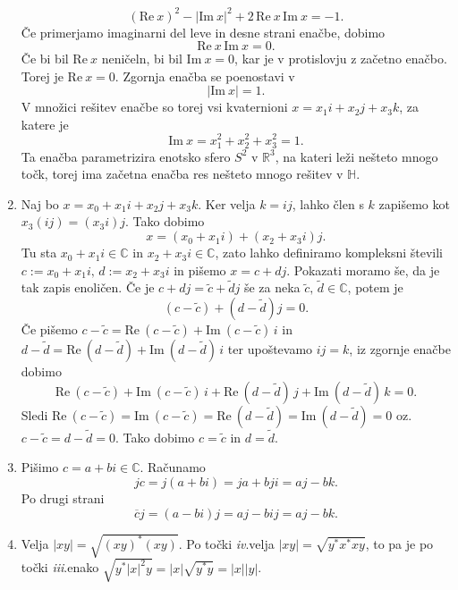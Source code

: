 \documentclass[mat1, tisk]{fmfdelo}
\numberwithin{equation}{section}
\begin{document}
\begin{dokaz}
\begin{enumerate}
        $$(\mathrm{Re} \: x)^2 - |\mathrm{Im} \: x|^2 + 2 \, \mathrm{Re} \: x \, \mathrm{Im} \: x = -1.$$
        Če primerjamo imaginarni del leve in desne strani enačbe, dobimo
        $$\mathrm{Re} \: x \, \mathrm{Im} \: x = 0.$$
        Če bi bil $\mathrm{Re} \: x$ neničeln, bi bil $\mathrm{Im} \: x = 0$, kar je v protislovju z začetno enačbo.
        Torej je $\mathrm{Re} \: x = 0$. Zgornja enačba se poenostavi v 
        $$|\mathrm{Im} \: x| = 1.$$
        V množici rešitev enačbe so torej vsi kvaternioni $x = x_{1}i + x_{2}j + x_{3}k$, za katere je 
        $$\mathrm{Im} \: x = x_{1}^2 + x_{2}^2 + x_{3}^2 = 1.$$
        Ta enačba parametrizira enotsko sfero $S^2$ v $\mathbb{R}^{3}$, na kateri leži nešteto mnogo točk, 
        torej ima začetna enačba res nešteto mnogo rešitev v $\mathbb{H}$.
        \item Naj bo
        $x = x_0 + x_1 i + x_2 j + x_3 k$.
        Ker velja $k=ij$, lahko člen s $k$ zapišemo kot $x_3(ij)=(x_3 i)j$. Tako dobimo
        \[
        x = (x_0 + x_1 i) + (x_2 + x_3 i)j.
        \]
        Tu sta $x_0+x_1 i\in\mathbb{C}$ in $x_2+x_3 i\in\mathbb{C}$, zato lahko definiramo kompleksni števili $c:=x_0+x_1 i, \, d:=x_2+x_3 i $
        in pišemo $x=c+dj$. Pokazati moramo še, da je tak zapis enoličen. Če je 
        $c+dj = \tilde{c} + \tilde{d}j$
        še za neka $\tilde{c}, \, \tilde{d} \in\mathbb{C}$, potem je
        \[
        (c-\tilde{c})+(d-\tilde{d})j=0.
        \]
        Če pišemo $c - \tilde{c} = \mathrm{Re} \: (c-\tilde{c}) + \mathrm{Im} \: (c-\tilde{c}) \, i$ in $d-\tilde{d} = \mathrm{Re} \:(d-\tilde{d}) + \mathrm{Im} \: (d-\tilde{d})\, i$
        ter upoštevamo $ij = k$, iz zgornje enačbe dobimo
        $$\mathrm{Re} \: (c-\tilde{c}) + \mathrm{Im} \: (c-\tilde{c}) \, i + \mathrm{Re} \:(d-\tilde{d})\, j + \mathrm{Im} \: (d-\tilde{d})\, k = 0.$$
        Sledi $\mathrm{Re} \: (c-\tilde{c}) = \mathrm{Im} \: (c-\tilde{c}) = \mathrm{Re} \:(d-\tilde{d}) = \mathrm{Im} \:(d-\tilde{d})= 0$ oz.\ 
        $c-\tilde{c} = d-\tilde{d} = 0$. Tako dobimo $c=\tilde{c}$ in $d=\tilde{d}$.
        \item Pišimo $c = a + bi \in \mathbb{C}$. Računamo
        $$jc = j(a + bi) = ja + bji = aj - bk.$$
        Po drugi strani 
        $$\overline{c}j = (a -bi)j = aj - bij = aj - bk.$$
        \item Velja $|xy| = \sqrt{(xy)^{*}(xy)}$. Po točki \textit{iv}.\@ velja $|xy| = \sqrt{y^{*}x^{*}xy}$, to pa je po točki \textit{iii}.\@  enako $\sqrt{y^{*}{|x|}^2y} = |x|\sqrt{y^{*}y} = |x| |y|$.
    \end{enumerate}
\end{dokaz}
\end{document}
